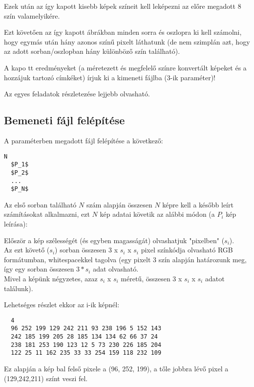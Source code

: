 \documentclass[12pt]{article}
\begin{document}
Ezek után az így kapott kisebb képek színeit kell leképezni az előre megadott 8 szín valamelyikére.

Ezt követően az így kapott ábrákban minden sorra és oszlopra ki kell számolni, hogy egymás után hány azonos színű pixelt láthatunk (de nem szimplán azt, hogy az adott sorban/oszlopban hány különböző szín található).

A kapo	tt eredményeket (a méretezett és megfelelő színre konvertált képeket és a hozzájuk tartozó címkéket) írjuk ki a kimeneti fájlba (3-ik paraméter)!

Az egyes feladatok részletezése lejjebb olvasható.

\subsection{Bemeneti fájl felépítése}

A paraméterben megadott fájl felépítése a következő:
\begin{lstlisting}[mathescape, columns=fullflexible,  basicstyle=\ttfamily,]
  N
  $P_1$
  $P_2$
  ...
  $P_N$
\end{lstlisting}

Az első sorban található $N$ szám alapján összesen $N$ képre kell a később leírt számításokat alkalmazni, ezt $N$ kép adatai követik az alábbi módon (a $P_i$ kép leírása):

Először a kép szélességét (és egyben magasságát) olvashatjuk "pixelben" ($s_i$). \\


Az ezt követő ($s_i$) sorban összesen $3$ x $s_i$ x $s_i$ pixel színkódja olvasható RGB formátumban, whitespacekkel tagolva (egy pixelt 3 szín alapján határozunk meg, így egy sorban összesen $3*s_i$ adat olvasható.
\\

Mivel a képünk négyzetes, azaz $s_i$ x $s_i$ méretű, összesen $3$ x $s_i$ x $s_i$ adatot találunk).\\

\pagebreak

Lehetséges részlet ekkor az i-ik képnél:
\begin{verbatim}	
  4 
  96 252 199 129 242 211 93 238 196 5 152 143
  242 185 199 205 28 185 134 134 62 66 37 24
  238 181 253 190 123 12 5 73 230 226 185 204
  122 25 11 162 235 33 33 254 159 118 232 109
\end{verbatim}

Ez alapján a kép bal felső pixele a (96, 252, 199), a tőle jobbra lévő pixel a (129,242,211) színt veszi fel.
\end{document}
